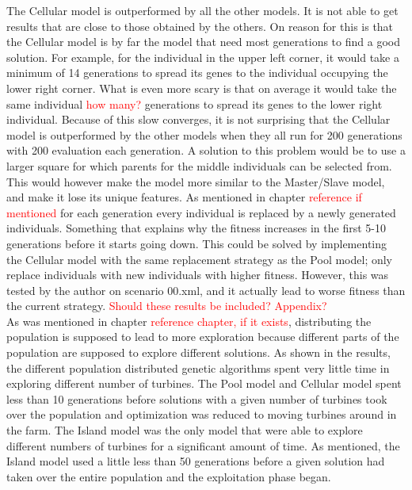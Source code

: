 \noindent The Cellular model is outperformed by all the other models. It is not able to get results that are close to those obtained by the others. On reason for this is that the Cellular model is by far the model that need most generations to find a good solution. For example, for the individual in the upper left corner, it would take a minimum of 14 generations to spread its genes to the individual occupying the lower right corner. What is even more scary is that on average it would take the same individual \textcolor{red}{how many?} generations to spread its genes to the lower right individual. Because of this slow converges, it is not surprising that the Cellular model is outperformed by the other models when they all run for 200 generations with 200 evaluation each generation. A solution to this problem would be to use a larger square for which parents for the middle individuals can be selected from. This would however make the model more similar to the Master/Slave model, and make it lose its unique features. As mentioned in chapter \textcolor{red}{reference if mentioned} for each generation every individual is replaced by a newly generated individuals. Something that explains why the fitness increases in the first 5-10 generations before it starts going down. This could be solved by implementing the Cellular model with the same replacement strategy as the Pool model; only replace individuals with new individuals with higher fitness. However, this was tested by the author on scenario 00.xml, and it actually lead to worse fitness than the current strategy. \textcolor{red}{Should these results be included? Appendix?}\\


\noindent As was mentioned in chapter \textcolor{red}{reference chapter, if it exists}, distributing the population is supposed to lead to more exploration because different parts of the population are supposed to explore different solutions. As shown in the results, the different population distributed genetic algorithms spent very little time in exploring different number of turbines. The Pool model and Cellular model spent less than 10 generations before solutions with a given number of turbines took over the population and optimization was reduced to moving turbines around in the farm. The Island model was the only model that were able to explore different numbers of turbines for a significant amount of time. As mentioned, the Island model used a little less than 50 generations before a given solution had taken over the entire population and the exploitation phase began. \\


